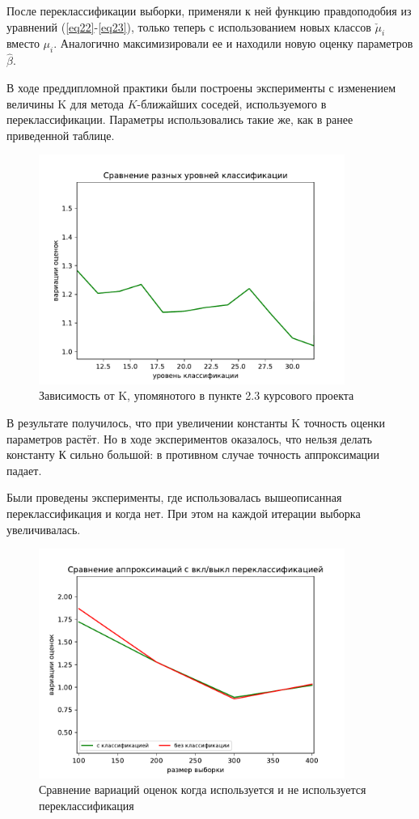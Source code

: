 После переклассификации выборки, применяли к ней функцию правдоподобия из уравнений (\ref{eq22}-\ref{eq23}), только теперь с использованием новых классов $\check{\mu}_i$ вместо $\mu_i$. 
Аналогично максимизировали ее и находили новую оценку параметров $\hat{\beta}$.

В ходе преддипломной практики были построены эксперименты с изменением величины K для метода $K$-ближайших соседей, используемого в переклассификации. Параметры использовались такие же, как в ранее приведенной таблице.
\newpage
\begin{figure}[ht!]
    \centering
    \includegraphics[width=100mm]{../images/different_recl_level.pdf}
    \caption{Зависимость от K, упомянотого в пункте 2.3 курсового проекта\label{overflow}}
    \label{pic1}
\end{figure}

В результате получилось, что при увеличении константы K точность оценки параметров растёт. Но в ходе экспериментов оказалось, что нельзя делать константу К сильно большой: в противном случае точность аппроксимации падает.

Были проведены эксперименты, где использовалась вышеописанная переклассификация и когда нет. При этом на каждой итерации выборка увеличивалась. 
\begin{figure}[h!]
    \centering
    \includegraphics[width=100mm]{../images/on_off_recl.pdf}
    \caption{Сравнение вариаций оценок когда используется и не используется переклассификация\label{overflow}}
    \label{pic2}
\end{figure}

